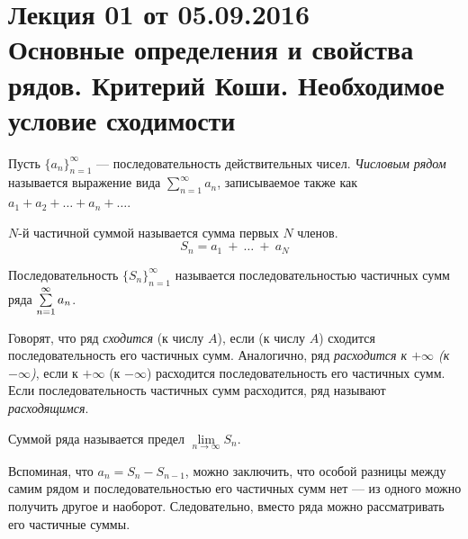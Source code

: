 \documentclass[a4paper, 12pt]{article}
\begin{document}
\pagestyle{fancy}
\section{Лекция 01 от 05.09.2016 \\ Основные определения и свойства рядов. Критерий Коши. Необходимое условие сходимости}
\begin{Def}
	Пусть \(\{a_n\}^{\infty}_{n=1}\) --- последовательность действительных чисел. \emph{Числовым рядом} называется выражение вида \(\sum\limits_{n=1}^{\infty}a_n\), записываемое также как \(a_1 + a_2 + \ldots + a_n + \ldots \).
	
\end{Def}
\begin{Def}
	\(N\)-й частичной суммой называется сумма первых \(N\) членов. 
	$$S_n = a_1~+~\ldots~+~a_N$$
\end{Def}

\begin{Def}
	Последовательность \(\{S_n\}^{\infty}_{n=1}\)
	называется последовательностью частичных сумм ряда $\sum\limits_{n=1}^{\infty}a_n$.
\end{Def}

Говорят, что ряд \textit{сходится} (к числу $A$), если (к числу $A$) сходится последовательность его частичных сумм. Аналогично, ряд \textit{расходится к $+\infty$ (к $-\infty$)}, если к $+\infty$ (к $-\infty$) расходится последовательность его частичных сумм. Если последовательность частичных сумм расходится, ряд называют \textit{расходящимся}.

\begin{Def}
Суммой ряда называется предел $\lim\limits_{n \to \infty} S_n$.
\end{Def}
Вспоминая, что $a_n = S_{n} - S_{n-1}$, можно заключить, что особой разницы между самим рядом и последовательностью его частичных сумм нет --- из одного можно получить другое и наоборот. Следовательно, вместо ряда можно рассматривать его частичные суммы.
\end{document}

